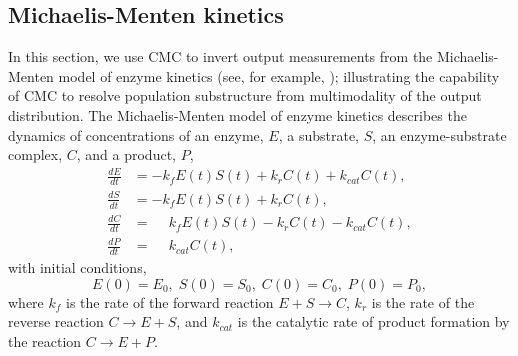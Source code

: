 \subsection{Michaelis-Menten kinetics}
In this section, we use CMC to invert output measurements from the Michaelis-Menten model of enzyme kinetics (see, for example, \cite{murray2007mathematical}); illustrating the capability of CMC to resolve population substructure from multimodality of the output distribution. The Michaelis-Menten model of enzyme kinetics describes the dynamics of concentrations of an enzyme, $E$, a substrate, $S$, an enzyme-substrate complex, $C$, and a product, $P$,
%
\begin{equation}\label{eq:michaelis_menten}
\begin{aligned}
\frac{dE}{dt} &= -k_f E(t)S(t) + k_r C(t) + k_{cat} C(t), \\
\frac{dS}{dt} &= -k_f E(t)S(t) + k_r C(t), \\
\frac{dC}{dt} &= \phantom{-}k_f E(t)S(t) - k_r C(t) - k_{cat} C(t), \\
\frac{dP}{dt} &= \phantom{-}k_{cat} C(t),
\end{aligned}
\end{equation}
%
with initial conditions,
\begin{equation}
E(0) = E_0, \; S(0)=S_0, \; C(0)=C_0, \; P(0)=P_0,
\end{equation}
%
where $k_f$ is the rate of the forward reaction $E+S \rightarrow C$, $k_r$ is the rate of the reverse reaction $C \rightarrow E+S$, and $k_{cat}$ is the catalytic rate of product formation by the reaction $C \rightarrow E + P$.


